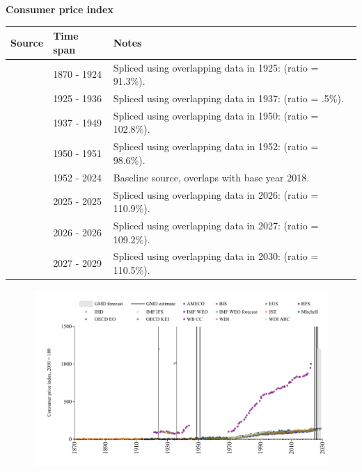 \documentclass[12pt,a4paper,landscape]{article}
\begin{document}
\begin{adjustbox}{max totalsize={\paperwidth}{\paperheight},center}
\begin{minipage}[t][\textheight][t]{\textwidth}
\vspace*{0.5cm}
{}
\begin{center}
{\Large\bfseries Consumer price index}
\end{center}
\vspace{0.5cm}
\begin{table}[H]
\centering
\small
\begin{tabular}{|l|l|l|}
\hline
\textbf{Source} & \textbf{Time span} & \textbf{Notes} \\
\hline
\rowcolor{white}\cite{JST}& 1870 - 1924 &Spliced using overlapping data in 1925: (ratio = 91.3\%). \\
\rowcolor{lightgray}\cite{IHD}& 1925 - 1936 &Spliced using overlapping data in 1937: (ratio = .5\%). \\
\rowcolor{white}\cite{JST}& 1937 - 1949 &Spliced using overlapping data in 1950: (ratio = 102.8\%). \\
\rowcolor{lightgray}\cite{IMF_IFS}& 1950 - 1951 &Spliced using overlapping data in 1952: (ratio = 98.6\%). \\
\rowcolor{white}\cite{BIS}& 1952 - 2024 &Baseline source, overlaps with base year 2018. \\
\rowcolor{lightgray}\cite{OECD_EO}& 2025 - 2025 &Spliced using overlapping data in 2026: (ratio = 110.9\%). \\
\rowcolor{white}\cite{AMECO}& 2026 - 2026 &Spliced using overlapping data in 2027: (ratio = 109.2\%). \\
\rowcolor{lightgray}\cite{IMF_WEO_forecast}& 2027 - 2029 &Spliced using overlapping data in 2030: (ratio = 110.5\%). \\
\hline
\end{tabular}
\end{table}
\begin{figure}[H]
\centering
\includegraphics[width=\textwidth,height=0.6\textheight,keepaspectratio]{graphs/FIN_CPI.pdf}
\end{figure}
\end{minipage}
\end{adjustbox}
\end{document}
